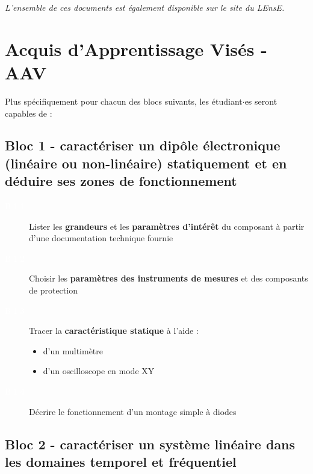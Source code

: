 \documentclass[a4paper,11pt,twoside]{book} %
\begin{document}
{\medskip

\textit{L'ensemble de ces documents est également disponible sur le site du LEnsE.}

\newpage

\section{Acquis d'Apprentissage Visés - AAV}

Plus spécifiquement pour chacun des blocs suivants, les étudiant$\cdot$es seront capables de :

\subsection{Bloc 1 - caractériser un dipôle électronique (linéaire ou non-linéaire) statiquement et en déduire ses zones de fonctionnement}

\begin{description}
	\item[\colorbox{violet_iogs!70}{\textcolor{white}{B 1.1}}] Lister les \textbf{grandeurs} et les \textbf{paramètres d'intérêt} du composant à partir d'une documentation technique fournie
	\item[\colorbox{violet_iogs!70}{\textcolor{white}{B 1.2}}] Choisir les \textbf{paramètres des instruments de mesures} et des composants de protection
	\item[\colorbox{violet_iogs!70}{\textcolor{white}{B 1.3}}] Tracer la \textbf{caractéristique statique} à l'aide :
	\begin{itemize}
		\item d'un multimètre
		\item d'un oscilloscope en mode XY
	\end{itemize}
	\item[\colorbox{violet_iogs!70}{\textcolor{white}{B 1.4}}] Décrire le fonctionnement d'un montage simple à diodes
\end{description}

\subsection{Bloc 2 - caractériser un système linéaire dans les domaines temporel et fréquentiel}

}
\end{document}
